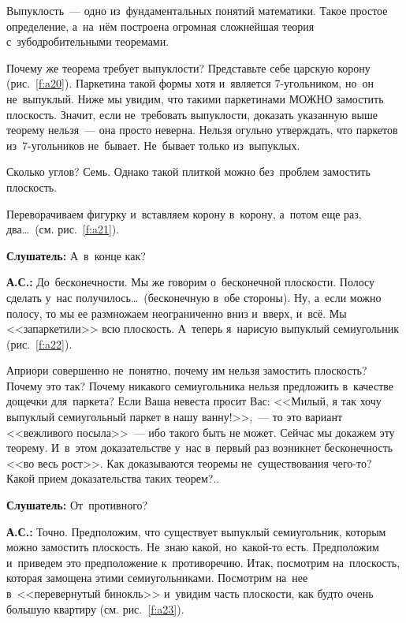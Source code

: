 \pagebreak

Выпуклость~--- одно из~фундаментальных понятий математики. Такое простое определение, а~на~нём
построена огромная сложнейшая теория с~зубодробительными теоремами.

Почему же теорема требует выпуклости? Представьте себе царскую корону (рис.~\ref{f:a20}). Паркетина такой
формы хотя и~является 7-угольником, но~он не~выпуклый. Ниже мы увидим, что такими паркетинами МОЖНО
замостить плоскость. Значит, если не~требовать выпуклости, доказать указанную выше теорему
нельзя~--- она просто неверна. Нельзя огульно утверждать, что паркетов из~7-угольников не~бывает.
Не~бывает только из~выпуклых.


Сколько углов? Семь. Однако такой плиткой можно без~проблем замостить плоскость.

Переворачиваем фигурку и~вставляем корону в~корону, а~потом еще раз, два\ldots\ (см. рис.~\ref{f:a21}).


\textbf{Слушатель:} А~в~конце как?

\textbf{А.С.:} До~бесконечности. Мы же говорим о~бесконечной плоскости. Полосу сделать у~нас
получилось\ldots\ (бесконечную в~обе стороны). Ну, а~если можно полосу, то мы ее размножаем неограниченно
вниз и~вверх, и~всё. Мы <<запаркетили>> всю плоскость. А~теперь я~нарисую выпуклый семиугольник
(рис.~\ref{f:a22}).


Априори совершенно не~понятно, почему им нельзя замостить плоскость? Почему это так? Почему
никакого семиугольника нельзя предложить в~качестве дощечки для~паркета?
Если Ваша невеста просит Вас: <<Милый, я так хочу выпуклый семиугольный паркет в нашу ванну!>>,~---
то это вариант <<вежливого посыла>>~--- ибо такого быть не может.
Сейчас мы докажем эту теорему. И~в~этом доказательстве
у~нас в~первый раз возникнет бесконечность <<во весь рост>>. Как доказываются теоремы
не~существования чего-то? Какой прием доказательства таких теорем?..

\textbf{Слушатель:} От~противного?

\textbf{А.С.:} Точно. Предположим, что существует выпуклый семиугольник, которым можно замостить
плоскость. Не~знаю какой, но~какой-то есть. Предположим и~приведем это предположение
к~противоречию. Итак, посмотрим на~плоскость, которая замощена этими семиугольниками.\vadjust{\pagebreak} Посмотрим
на~нее в~<<перевернутый бинокль>> и~увидим часть плоскости, как будто очень большую квартиру (см. рис.~\ref{f:a23}).

